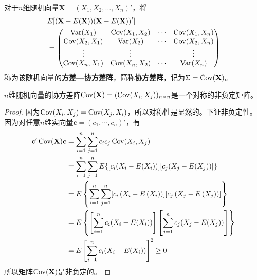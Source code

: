 \begin{definition}[协方差矩阵]
    对于$n$维随机向量$\mathbf{X}=(X_1,X_2,\ldots,X_n)'$，将
    \begin{align*}
         & E[(\mathbf{X}-E(\mathbf{X}))(\mathbf{X}-E(\mathbf{X}))' ] \\
         & =\begin{pmatrix}
                \operatorname{Var}(X_1)     & \operatorname{Cov}(X_1,X_2) & \cdots & \operatorname{Cov}(X_1,X_n) \\
                \operatorname{Cov}(X_2,X_1) & \operatorname{Var}(X_2)     & \cdots & \operatorname{Cov}(X_2,X_n) \\
                \vdots        & \vdots        &        & \vdots        \\
                \operatorname{Cov}(X_n,X_1) & \operatorname{Cov}(X_n,X_2) & \cdots & \operatorname{Var}(X_n)
            \end{pmatrix}
    \end{align*}
    称为该随机向量的\textbf{方差—协方差阵}，简称\textbf{协方差阵}，记为$\Sigma=\operatorname{Cov}(\mathbf{X})$。
\end{definition}

\begin{theorem}
    $n$维随机向量的协方差阵$\operatorname{Cov}(\mathbf{X})=(\operatorname{Cov}(X_i,X_j))_{n\times n}$是一个对称的非负定矩阵。
\end{theorem}
\begin{proof}
    因为$\operatorname{Cov}(X_i,X_j)=\operatorname{Cov}(X_j,X_i)$，所以对称性是显然的。下证非负定性。因为对任意$n$维实向量$\mathbf{c}=(c_1,\cdots ,c_n)'$，有
    \begin{align*}
        \mathbf{c}'\operatorname{Cov}(\mathbf{X})\mathbf{c} & = \sum_{i=1}^n\sum_{j=1}^n c_i c_j \operatorname{Cov}(X_i,X_j)                                                                           \\
                                              & = \sum_{i=1}^n\sum_{j=1}^n E\{ [c_i(X_i-E(X_i))] [c_j(X_j-E(X_j))] \}                                                      \\
                                              & = E\left\{\sum_{i=1}^n \sum_{j=1}^n [c_i\left(X_i-E\left(X_i\right)\right)][c_j\left(X_j-E\left(X_j\right)\right)]\right\} \\
                                              & = E\left\{\left[\sum_{i=1}^n c_i(X_i-E(X_i))\right]\left[\sum_{j=1}^n  c_j(X_j-E(X_j))\right]\right\}                      \\
                                              & = E\left[\sum_{i=1}^n  c_i(X_i-E(X_i))\right]^2 \ge 0
    \end{align*}
    所以矩阵$\operatorname{Cov}(\mathbf{X})$是非负定的。
\end{proof}


